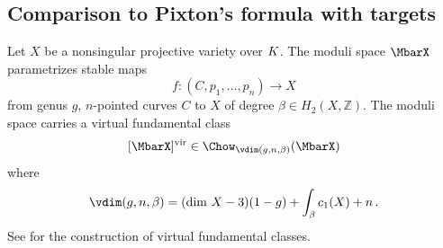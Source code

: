 


\subsection{Comparison to Pixton's formula with targets}\label{sec:pixton_targets_vs_univ}
Let $X$ be a nonsingular projective variety over ${K}$. The moduli space
$\MbarX$ parametrizes stable maps
$$f\colon (C,p_1,\ldots,p_n)\to X$$
from genus $g$, $n$-pointed curves $C$ to $X$ of degree $\beta \in H_2(X,\mathbb{Z})$. The moduli space carries a virtual fundamental class
$$[\MbarX]^\textup{vir} \in \Chow_{\vdim(g,n,\beta)}(\MbarX)$$
where
$$\vdim(g,n,\beta) = (\dim \,X -3)(1-g) + \int_{\beta} c_{1}(X) + n\, .$$
See \cite{Behrend1997The-intrinsic-n} for the construction of virtual fundamental classes.


